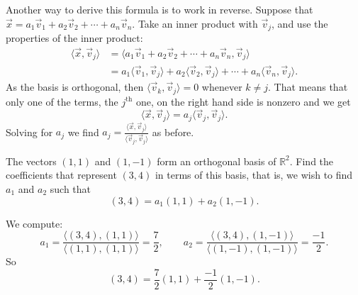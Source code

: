 \documentclass{ximera}
\begin{document}
Another way to derive this formula is to work in reverse.  Suppose that
$\vec{x} = a_1 \vec{v}_1 + a_2 \vec{v}_2 + \cdots + a_n \vec{v}_n$.  
Take an inner product with $\vec{v}_j$, and use the properties of the inner product:
\begin{equation*}
    \begin{split}
        \langle \vec{x} , \vec{v}_j \rangle
        & =\langle a_1 \vec{v}_1 + a_2 \vec{v}_2 + \cdots + a_n \vec{v}_n , \vec{v}_j \rangle \\
        & = a_1 \langle \vec{v}_1 , \vec{v}_j \rangle + a_2 \langle \vec{v}_2 , \vec{v}_j \rangle + \cdots + a_n \langle \vec{v}_n , \vec{v}_j \rangle .
    \end{split}
\end{equation*}
As the basis is orthogonal, then $\langle \vec{v}_k , \vec{v}_j \rangle = 0$ whenever $k \not= j$.  That means that only one of the terms, the $j^{\text{th}}$ one, on the right hand side is nonzero and we get
\begin{equation*}
    \langle \vec{x} , \vec{v}_j \rangle = a_j \langle \vec{v}_j , \vec{v}_j \rangle .
\end{equation*}
Solving for $a_j$ we find $a_j = \frac{\langle \vec{x}, \vec{v}_j \rangle}{\langle \vec{v}_j, \vec{v}_j \rangle}$ as before.

\begin{example}
    The vectors $(1,1)$ and $(1,-1)$ form an orthogonal basis of ${\mathbb{R}}^2$. Find the coefficients that represent $(3,4)$ in terms of this basis, that is, we wish to find $a_1$ and $a_2$ such that
    \begin{equation*}
        (3,4) = a_1 (1,1) + a_2 (1,-1) .
    \end{equation*}
\end{example}

\begin{exampleSol}
    We compute:
    \begin{equation*}
        a_1 = \frac{\langle (3,4), (1,1) \rangle}{\langle (1,1), (1,1) \rangle}
        = \frac{7}{2}, \qquad a_2 = \frac{\langle (3,4), (1,-1) \rangle}{\langle (1,-1), (1,-1) \rangle}
        =\frac{-1}{2} .
    \end{equation*}
    So
    \begin{equation*}
        (3,4) = \frac{7}{2} (1,1) + \frac{-1}{2} (1,-1) .
    \end{equation*}
\end{exampleSol}
\end{document}
